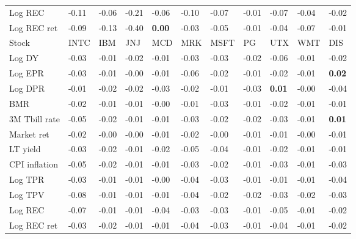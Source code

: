\begin{table}[h!]
{\begin{center}
\begin{tabularx}{1\textwidth}{@{}X@{\hspace{0.25cm}}l@{\hspace{0.25cm}}l@{\hspace{0.25cm}}l@{\hspace{0.25cm}}l@{\hspace{0.25cm}}l@{\hspace{0.25cm}}l@{\hspace{0.25cm}}l@{\hspace{0.25cm}}l@{\hspace{0.25cm}}l@{\hspace{0.25cm}}l@{}}
 Log REC  & -0.11	 & -0.06	 & -0.21	 & -0.06	 & -0.10	 & -0.07	 & -0.01	 & -0.07	 & -0.04	 & -0.02	\\
 Log REC ret  & -0.09	 & -0.13	 & -0.40	 & \textbf{0.00}	 & -0.03	 & -0.05	 & -0.01	 & -0.04	 & -0.07	 & -0.01	\\
\midrule
\midrule
 Stock  & INTC	 & IBM	 & JNJ	 & MCD	 & MRK	 & MSFT	 & PG	 & UTX	 & WMT	 & DIS	\\
\midrule
 Log DY  & -0.03	 & -0.01	 & -0.02	 & -0.01	 & -0.03	 & -0.03	 & -0.02	 & -0.06	 & -0.01	 & -0.02	\\
 Log EPR  & -0.03	 & -0.01	 & -0.00	 & -0.01	 & -0.06	 & -0.02	 & -0.01	 & -0.02	 & -0.01	 & \textbf{0.02}	\\
 Log DPR  & -0.01	 & -0.02	 & -0.02	 & -0.03	 & -0.02	 & -0.01	 & -0.03	 & \textbf{0.01}	 & -0.00	 & -0.04	\\
 BMR  & -0.02	 & -0.01	 & -0.01	 & -0.00	 & -0.01	 & -0.03	 & -0.01	 & -0.02	 & -0.01	 & -0.01	\\
\midrule
 3M Tbill rate  & -0.05	 & -0.02	 & -0.01	 & -0.01	 & -0.03	 & -0.02	 & -0.02	 & -0.03	 & -0.01	 & \textbf{0.01}	\\
 Market ret  & -0.02	 & -0.00	 & -0.00	 & -0.01	 & -0.02	 & -0.00	 & -0.01	 & -0.01	 & -0.00	 & -0.01	\\
 LT yield  & -0.03	 & -0.02	 & -0.01	 & -0.02	 & -0.05	 & -0.04	 & -0.01	 & -0.02	 & -0.01	 & -0.01	\\
 CPI inflation  & -0.05	 & -0.02	 & -0.01	 & -0.01	 & -0.03	 & -0.02	 & -0.01	 & -0.03	 & -0.01	 & -0.03	\\
\midrule
 Log TPR  & -0.03	 & -0.01	 & -0.01	 & -0.00	 & -0.04	 & -0.03	 & -0.01	 & -0.01	 & -0.01	 & -0.04	\\
 Log TPV  & -0.08	 & -0.01	 & -0.01	 & -0.01	 & -0.04	 & -0.02	 & -0.02	 & -0.03	 & -0.02	 & -0.03	\\
 Log REC  & -0.07	 & -0.01	 & -0.01	 & -0.04	 & -0.03	 & -0.03	 & -0.01	 & -0.05	 & -0.01	 & -0.02	\\
 Log REC ret  & -0.03	 & -0.02	 & -0.01	 & -0.01	 & -0.04	 & -0.03	 & -0.01	 & -0.04	 & -0.01	 & -0.02	\\
\bottomrule\bottomrule
\end{tabularx}
\vspace{0.2cm}

\end{center}}
\end{table}
